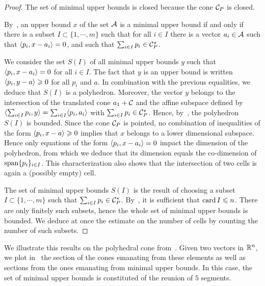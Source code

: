 \documentclass[main]{subfiles}
\begin{document}
\begin{proof}
The set of minimal upper bounds is closed because the cone $\mathcal{C}_P$ is closed.

By~, an upper bound $x$ of the set $\mathcal{A}$ is a minimal upper bound if and only if there is a subset $I \subset \{1,\cdots,m\}$ such that for all $i \in I$ there is a vector $a_i \in \mathcal{A}$ such that $\langle {p_i} , {x-a_i} \rangle = 0$, and such that $\sum_{i \in I} p_i \in \mathcal{C}_P^\star$.

We consider the set $S(I)$ of all minimal upper bounds $y$ such that $\langle {p_i} , {x-a_i} \rangle = 0$ for all $i \in I$.
The fact that $y$ is an upper bound is written $\langle {p_i} , {y-a} \rangle \geqslant 0$ for all $p_i$ and $a$. 
In combination with the previous equalities, we deduce that $S(I)$ is a polyhedron. Moreover, the vector $y$ belongs to the intersection of the translated cone $a_1 + \mathcal{C}$ and the affine subspace defined by $\langle {\sum_{i\in I} p_i} , {y} \rangle = \sum_{i\in I} \langle {p_i} , {a_i} \rangle$ with $\sum_{i\in I} p_i \in \mathcal{C}_P^\star$. Hence, by~, the polyhedron $S(I)$ is bounded.
Since the cone $\mathcal{C}_P$ is pointed, no combination of inequalities of the form $\langle {p_i} , {x-a} \rangle \geqslant 0$ implies that $x$ belongs to a lower dimensional subspace. Hence only equations of the form $\langle {p_i} , {x-a_i} \rangle = 0$ impact the dimension of the polyhedron, from which we deduce that its dimension equals the co-dimension of $\operatorname{span} \{p_i\}_{i \in I}$.
This characterization also shows that the intersection of two cells is again a (possibly empty) cell.

The set of minimal upper bounds $S(I)$ is the result of choosing a subset $I \subset \{1, \cdots, m\}$ such that $\sum_{i\in I} p_i \in \mathcal{C}_P^\star$. By~, it is sufficient that $\operatorname{card} I \leqslant n$. 
There are only finitely such subsets, hence the whole set of minimal upper bounds is bounded.
We deduce at once the estimate on the number of cells by counting the number of such subsets.
\end{proof}

We illustrate this results on the polyhedral cone from~. Given two vectors in $\mathbb{R}^n$, we plot in~
 the section of the cones emanating from these elements as well as sections from the ones emanating from  minimal upper bounds. In this case, the set of minimal upper bounds is constituted of the reunion of $5$ segments. 
\end{document}
